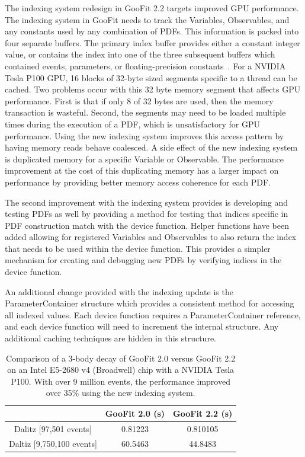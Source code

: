 \documentclass{webofc}
\begin{document}
The indexing system redesign in GooFit 2.2 targets improved GPU performance. The indexing system in GooFit needs to track the Variables, Observables, and any constants used by any combination of PDFs. This information is packed into four separate buffers. The primary index buffer provides either a constant integer value, or contains the index into one of the three subsequent buffers which contained events, parameters, or floating-precision constants~\cite{lib:GooFit:main}. For a NVIDIA Tesla P100 GPU, 16 blocks of 32-byte sized segments specific to a thread can be cached. Two problems occur with this 32 byte memory segment that affects GPU performance. First is that if only 8 of 32 bytes are used, then the memory transaction is wasteful. Second, the segments may need to be loaded multiple times during the execution of a PDF, which is unsatisfactory for GPU performance. Using the new indexing system improves this access pattern by having memory reads behave coalesced. A side effect of the new indexing system is duplicated memory for a specific Variable or Observable. The performance improvement at the cost of this duplicating memory has a larger impact on performance by providing better memory access coherence for each PDF.

The second improvement with the indexing system provides is developing and testing PDFs as well by providing a method for testing that indices specific in PDF construction match with the device function. Helper functions have been added allowing for registered Variables and Observables to also return the index that needs to be used within the device function. This provides a simpler mechanism for creating and debugging new PDFs by verifying indices in the device function. 

An additional change provided with the indexing update is the ParameterContainer structure which provides a consistent method for accessing all indexed values. Each device function requires a ParameterContainer reference, and each device function will need to increment the internal structure. Any additional caching techniques are hidden in this structure.

\begin{table}[h]
	\centering
	\begin{tabular}{c|c|c}
			 & GooFit 2.0 (s) & GooFit 2.2 (s) \\
		\hline
			Dalitz [97,501 events] & 0.81223 & 0.810105 \\
			Daltiz [9,750,100 events] & 60.5463 & 44.8483 \\
	\end{tabular}
	\caption{Comparison of a 3-body decay of GooFit 2.0 versus GooFit 2.2 on an Intel E5-2680 v4 (Broadwell) chip with a NVIDIA Tesla P100. With over 9 million events, the performance improved over 35\% using the new indexing system. }
	\label{table:1}
\end{table}
\end{document}
